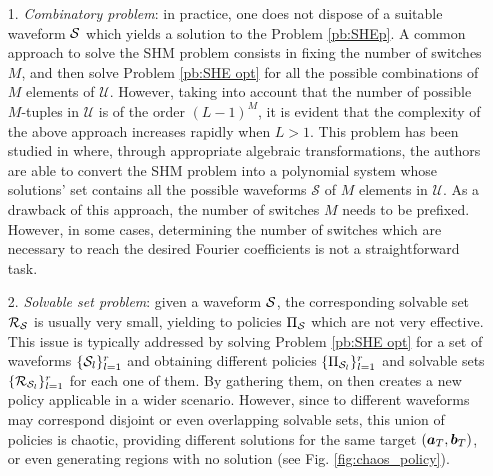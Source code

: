 \documentclass[9pt,shortpaper,twoside,web]{ieeecolor}
\begin{document}
\begin{itemize}
	\item[1.] \textit{Combinatory problem}: in practice, one does not dispose of a suitable waveform $\mathcal{S}$ which yields a solution to the Problem \ref{pb:SHEp}. A common approach to solve the SHM problem consists in fixing the number of switches $M$, and then solve Problem \ref{pb:SHE opt} for  all the possible combinations of $M$ elements of $\mathcal{U}$. However, taking into account that the number of possible $M$-tuples  in $\mathcal U$ is of the order $(L-1)^M$, it is evident that the complexity of the above approach increases rapidly when $L>1$. This problem has been studied in \cite{Yang2015} where, through appropriate algebraic transformations, the authors are able to convert the SHM problem into a polynomial system whose solutions' set contains all the possible waveforms $\mathcal S$ of $M$ elements in $\mathcal{U}$. As a drawback of this approach, the number of switches $M$ needs to be prefixed. However, in some cases,  determining the number of switches which are necessary to reach the desired Fourier coefficients is not a straightforward task.
	
	\item[2.] \textit{Solvable set problem}: given a waveform $\mathcal{S}$, the corresponding solvable set $\mathcal{R}_{\mathcal{S}}$ is usually very small, yielding to policies $\Pi_{\mathcal{S}}$ which are not very effective. This issue is typically addressed by solving Problem \ref{pb:SHE opt} for a set of waveforms $\{\mathcal{S}_l\}_{l=1}^r$ and obtaining different policies $\{\Pi_{\mathcal{S}_l}\}_{l=1}^r$ and solvable sets $\{\mathcal{R}_{\mathcal{S}_l}\}_{l=1}^r$ for each one of them. By gathering them, on then creates a new policy applicable in a wider scenario. However, since to different waveforms may correspond disjoint or even overlapping solvable sets, this union of policies is chaotic, providing different solutions for the same target $(\bm{a}_T,\bm{b}_T)$, or even generating regions with no solution (see Fig. \ref{fig:chaos_policy}).
	

\end{itemize}
\end{document}
